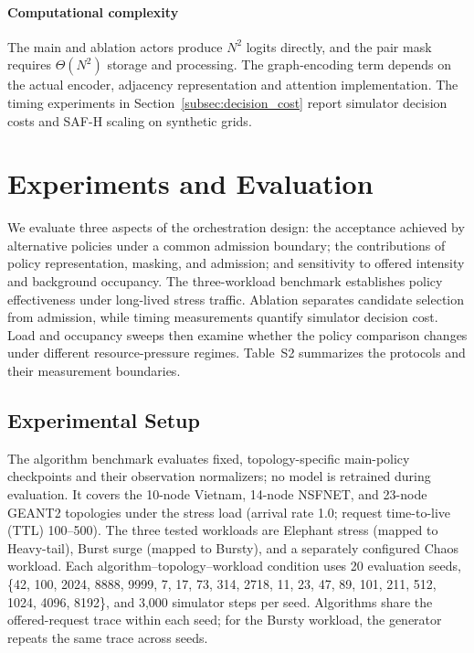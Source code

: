 \documentclass[final,5p]{elsarticle}
\newcommand{\rev}[1]{\textcolor{revisiongreen}{#1}}
\let\newrev\rev
\begin{document}
\paragraph{Computational complexity}\label{subsec:harp_complexity}
\newrev{The main and ablation actors produce \(N^2\) logits directly, and the pair mask requires \(\Theta(N^2)\) storage and processing. The graph-encoding term depends on the actual encoder, adjacency representation and attention implementation. The timing experiments in Section~\ref{subsec:decision_cost} report simulator decision costs and SAF-H scaling on synthetic grids.}

\section{Experiments and Evaluation}
\label{sec:evaluation}
\newrev{We evaluate three aspects of the orchestration design: the acceptance achieved by alternative policies under a common admission boundary; the contributions of policy representation, masking, and admission; and sensitivity to offered intensity and background occupancy. The three-workload benchmark establishes policy effectiveness under long-lived stress traffic. Ablation separates candidate selection from admission, while timing measurements quantify simulator decision cost. Load and occupancy sweeps then examine whether the policy comparison changes under different resource-pressure regimes. Table~S2 summarizes the protocols and their measurement boundaries.}

\subsection{\newrev{Experimental Setup}}
\label{subsec:experimental_setup}
\newrev{The algorithm benchmark evaluates fixed, topology-specific main-policy checkpoints and their observation normalizers; no model is retrained during evaluation. It covers the 10-node Vietnam, 14-node NSFNET, and 23-node GEANT2 topologies under the stress load (arrival rate 1.0; request time-to-live (TTL) 100--500). The three tested workloads are Elephant stress (mapped to Heavy-tail), Burst surge (mapped to Bursty), and a separately configured Chaos workload. Each algorithm--topology--workload condition uses 20 evaluation seeds, \{42, 100, 2024, 8888, 9999, 7, 17, 73, 314, 2718, 11, 23, 47, 89, 101, 211, 512, 1024, 4096, 8192\}, and 3,000 simulator steps per seed. Algorithms share the offered-request trace within each seed; for the Bursty workload, the generator repeats the same trace across seeds.}
\end{document}
